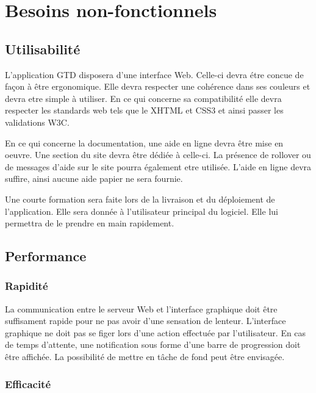 \chapter{Besoins non-fonctionnels}

\section{Utilisabilité}

L'application GTD disposera d'une interface Web. Celle-ci devra étre concue de façon à être ergonomique. Elle devra respecter une cohérence dans ses couleurs et devra etre simple à utiliser. En ce qui concerne sa compatibilité elle devra respecter les standards web tels que le XHTML et CSS3 et ainsi passer les validations W3C.

\medskip

En ce qui concerne la documentation, une aide en ligne devra être mise en oeuvre. Une section du site devra être dédiée à celle-ci. La présence de rollover ou de messages d'aide sur le site pourra également etre utilisée. L'aide en ligne devra suffire, ainsi aucune aide papier ne sera fournie.


\medskip

Une courte formation sera faite lors de la livraison et du déploiement de l'application. Elle sera donnée à l'utilisateur principal du logiciel. Elle lui permettra de le prendre en main rapidement.


\section{Performance}

	\subsection{Rapidité}

	La communication entre le serveur Web et l'interface graphique doit être suffisament rapide pour ne pas avoir d'une sensation de lenteur. L'interface graphique ne doit pas se figer lors d'une action effectuée par l'utilisateur.
	En cas de temps d'attente, une notification sous forme d'une barre de progression doit être affichée. La possibilité de mettre en tâche de fond peut être envisagée.

	\subsection{Efficacité}

